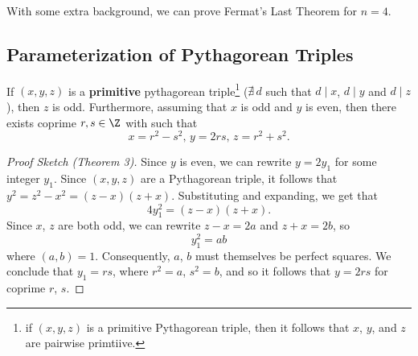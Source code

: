 \documentclass[11pt]{article}
\begin{document}
With some extra background, we can prove Fermat's Last Theorem for $n = 4$.

\subsection{Parameterization of Pythagorean Triples}

\begin{theorem}
If $(x, y, z)$ is a \textbf{primitive} pythagorean triple\footnote{if $(x, y, z)$ is a primitive Pythagorean triple, then it follows that $x$, $y$, and $z$ are pairwise primtiive.    
} ($\nexists \, d$ such that $d \mid x$, $d\mid y$ and $d \mid z$), then $z$ is odd. Furthermore, assuming that
$x$ is odd and $y$ is even, then there exists coprime $r, s \in \Z$ with such that
\[ x = r^2 - s^2, \, y = 2rs, \, z = r^2 + s^2. \]
\end{theorem}

\begin{proof}[Proof Sketch (Theorem 3)]
Since $y$ is even, we can rewrite $y = 2y_1$ for some integer $y_1$. Since $(x, y, z)$ are a Pythagorean triple, it follows that
\( y^2 = z^2 - x^2 = (z-x)(z+x). \) Substituting and expanding, we get that 
\[
    4y_1^2 = (z-x)(z+x).
\] 
Since $x$, $z$ are both odd, we can rewrite $z-x = 2a$ and $z+x =2b$, so 
\[ y_1^2 = ab\] where $(a, b) = 1$. Consequently, $a$, $b$ must themselves be perfect squares. We conclude that $y_1=rs$, where $r^2 = a$, $s^2=b$, and so it follows that
$y = 2rs$ for coprime $r$, $s$. 
\end{proof}
\end{document}

